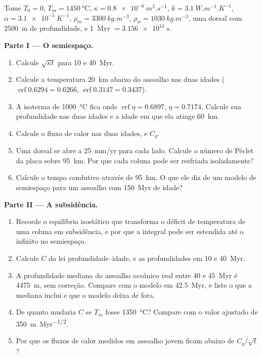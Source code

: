 \begin{problem}
\label{pb:b3:lithosphere-thermal-models:1}
Tome $T_0 = 0$, $T_m = \qty{1450}{\celsius}$, $\kappa =
\qty{0.8e-6}{m^2.s^{-1}}$, $k = \qty{3.1}{W.m^{-1}.K^{-1}}$, $\alpha =
\qty{3.1e-5}{K^{-1}}$, $\rho_m = \qty{3300}{kg.m^{-3}}$, $\rho_w =
\qty{1030}{kg.m^{-3}}$, uma dorsal com \qty{2500}{m} de profundidade, e \qty{1}{Myr} $=
\qty{3.156e13}{s}$.

\medskip\noindent\textbf{Parte I --- O semiespaço.}
\begin{enumerate}
  \item Calcule $\sqrt{\kappa t}$ para 10 e \qty{40}{Myr}.
  \item Calcule a temperatura \qty{20}{km} abaixo do assoalho nas duas idades
        ($\operatorname{erf}0.6294 = 0.6266$, $\operatorname{erf}0.3147 =
        0.3437$).
  \item A isoterma de \qty{1000}{\celsius} fica onde $\operatorname{erf}\eta =
        0.6897$, $\eta = 0.7174$. Calcule sua profundidade nas duas idades e a idade
        em que ela atinge \qty{60}{km}.
  \item Calcule o fluxo de calor nas duas idades, e $C_q$.
  \item Uma dorsal se abre a \qty{25}{mm/yr} para cada lado. Calcule o número de Péclet
        da placa sobre \qty{95}{km}. Por que cada coluna pode ser resfriada
        isoladamente?
  \item Calcule o tempo condutivo através de \qty{95}{km}. O que ele diz de
        um modelo de semiespaço para um assoalho com \qty{150}{Myr} de idade?
\end{enumerate}

\medskip\noindent\textbf{Parte II --- A subsidência.}
\begin{enumerate}[resume]
  \item Recorde o equilíbrio isostático que transforma o déficit de temperatura de
        uma coluna em subsidência, e por que a integral pode ser estendida até o
        infinito no semiespaço.
  \item Calcule $C$ da lei profundidade--idade, e as profundidades em 10 e
        \qty{40}{Myr}.
  \item A profundidade mediana do assoalho oceânico real entre 40 e \qty{45}{Myr}
        é \qty{4475}{m}, sem correção. Compare com o modelo em
        \qty{42.5}{Myr}, e liste o que a mediana inclui e que o modelo
        deixa de fora.
  \item De quanto mudaria $C$ se $T_m$ fosse \qty{1350}{\celsius}?
        Compare com o valor ajustado de \qty{350}{m.Myr^{-1/2}}.
  \item Por que os fluxos de calor medidos em assoalho jovem ficam abaixo de $C_q/\sqrt t$?
\end{enumerate}


\end{problem}
